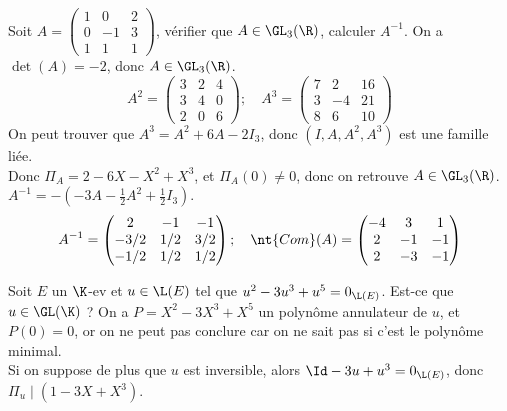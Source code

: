 \documentclass[11pt]{article}
\begin{document}
\begin{ex}{}{}
    Soit $A=\begin{pmatrix}1&0&2\\0&-1&3\\1&1&1\end{pmatrix}$, vérifier que $A\in\GL_3(\R)$, calculer $A^{-1}$.
    \tcblower
    On a $\det(A)=-2$, donc $A\in\GL_3(\R)$.
    \begin{equation*}
        A^2 = \begin{pmatrix}
            3 & 2 & 4 \\ 3 & 4 & 0 \\ 2 & 0 & 6
        \end{pmatrix}; \quad A^3 = \begin{pmatrix}
            7 & 2 & 16 \\ 3 & -4 & 21 \\ 8 & 6 & 10
        \end{pmatrix}
    \end{equation*}
    On peut trouver que $A^3=A^2+6A-2I_3$, donc $(I,A,A^2,A^3)$ est une famille liée.\\
    Donc $\Pi_A = 2 - 6X - X^2 + X^3$, et $\Pi_A(0)\neq0$, donc on retrouve $A\in\GL_3(\R)$.\\
    $A^{-1}=-\left( -3A - \frac{1}{2}A^2 + \frac{1}{2}I_3 \right)$. 
    \begin{equation*}
        A^{-1} = \begin{pmatrix} 2 & -1 & -1 \\ -3/2 & 1/2 & 3/2 \\ -1/2 & 1/2 & 1/2  \end{pmatrix}; \quad \nt{Com}(A) = \begin{pmatrix}-4&3&1\\2&-1&-1\\2&-3&-1\end{pmatrix} 
    \end{equation*}
\end{ex}

\vspace*{-0.5cm}

\begin{ex}{}{}
    Soit $E$ un $\K$-ev et $u\in\L(E)$ tel que $u^2-3u^3+u^5=0_{\L(E)}$. Est-ce que $u\in\GL(\K)$ ?
    \tcblower
    On a $P=X^2-3X^3+X^5$ un polynôme annulateur de $u$, et $P(0)=0$, or on ne peut pas conclure car on ne sait pas si c'est le polynôme minimal.\\
    Si on suppose de plus que $u$ est inversible, alors $\Id - 3u + u^3 = 0_{\L(E)}$, donc $\Pi_u \mid (1-3X+X^3)$.
\end{ex}
\end{document}
